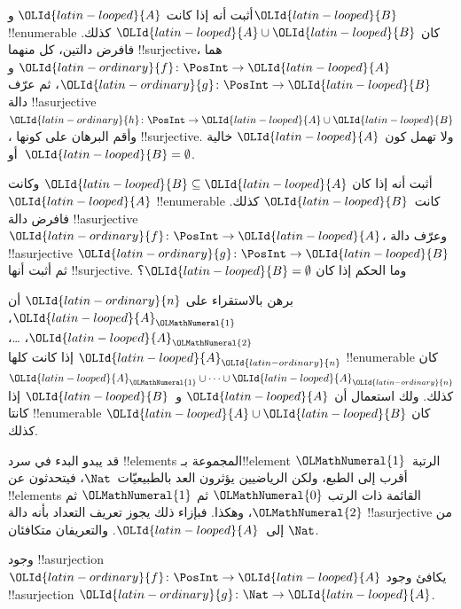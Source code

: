 \documentclass[../../../include/open-logic-section]{subfiles}
\begin{document}
\begin{prob}
أثبت أنه إذا كانت $\OLId{latin-looped}{A}$ و$\OLId{latin-looped}{B}$ !!{enumerable} كان $\OLId{latin-looped}{A} \cup \OLId{latin-looped}{B}$ كذلك.
فافرض دالتين، كل منهما !!{surjective}، هما $\OLId{latin-ordinary}{f}\colon \PosInt \to \OLId{latin-looped}{A}$ و$\OLId{latin-ordinary}{g}\colon \PosInt \to \OLId{latin-looped}{B}$،
ثم عرّف دالة !!a{surjective}~$\OLId{latin-ordinary}{h}\colon \PosInt \to \OLId{latin-looped}{A} \cup \OLId{latin-looped}{B}$،
وأقم البرهان على كونها !!{surjective}. ولا تهمل كون $\OLId{latin-looped}{A}$ خالية
أو~$\OLId{latin-looped}{B} = \emptyset$.
\end{prob}

\begin{prob}
أثبت أنه إذا كان $\OLId{latin-looped}{B} \subseteq \OLId{latin-looped}{A}$ وكانت $\OLId{latin-looped}{A}$ !!{enumerable} كانت~$\OLId{latin-looped}{B}$ كذلك.
فافرض دالة !!a{surjective} $\OLId{latin-ordinary}{f}\colon \PosInt \to \OLId{latin-looped}{A}$،
وعرّف دالة !!a{surjective} $\OLId{latin-ordinary}{g}\colon \PosInt \to \OLId{latin-looped}{B}$ ثم أثبت أنها
!!{surjective}. وما الحكم إذا كان $\OLId{latin-looped}{B} = \emptyset$؟
\end{prob}

\begin{prob}
برهن بالاستقراء على $\OLId{latin-ordinary}{n}$ أن $\OLId{latin-looped}{A}_\OLMathNumeral{1}$، $\OLId{latin-looped}{A}_\OLMathNumeral{2}$، \dots، $\OLId{latin-looped}{A}_\OLId{latin-ordinary}{n}$ إذا كانت
كلها !!{enumerable} كان $\OLId{latin-looped}{A}_\OLMathNumeral{1} \cup \dots \cup \OLId{latin-looped}{A}_\OLId{latin-ordinary}{n}$ كذلك.
ولك استعمال أن $\OLId{latin-looped}{A}$ و~$\OLId{latin-looped}{B}$ إذا كانتا !!{enumerable} كان $\OLId{latin-looped}{A} \cup \OLId{latin-looped}{B}$ كذلك.
\end{prob}

قد يبدو البدء في سرد !!{element}s المجموعة بـ!!{element} الرتبة~$\OLMathNumeral{1}$
أقرب إلى الطبع، ولكن الرياضيين يؤثرون العد بالطبيعيّات~$\Nat$،
فيتحدثون عن !!{element}s القائمة ذات الرتب $\OLMathNumeral{0}$ ثم $\OLMathNumeral{1}$ ثم $\OLMathNumeral{2}$، وهكذا.
فبإزاء ذلك يجوز تعريف التعداد بأنه دالة !!a{surjective} من $\Nat$
إلى~$\OLId{latin-looped}{A}$. والتعريفان متكافئان.

\begin{prop}
وجود !!a{surjection} $\OLId{latin-ordinary}{f}\colon \PosInt \to \OLId{latin-looped}{A}$ يكافئ وجود
!!a{surjection} $\OLId{latin-ordinary}{g}\colon \Nat \to \OLId{latin-looped}{A}$.
\end{prop}
\end{document}
